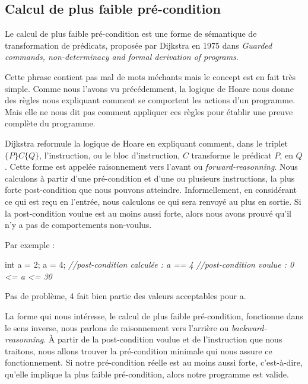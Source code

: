 \documentclass[12pt,francais,]{scrbook}
\newenvironment{Shaded}{}{}
\newcommand{\DataTypeTok}[1]{\textcolor[rgb]{0.56,0.13,0.00}{{#1}}}
\newcommand{\DecValTok}[1]{\textcolor[rgb]{0.25,0.63,0.44}{{#1}}}
\newcommand{\CommentTok}[1]{\textcolor[rgb]{0.38,0.63,0.69}{\textit{{#1}}}}
\newcommand{\NormalTok}[1]{{#1}}
\begin{document}
\subsection{Calcul de plus faible
pré-condition}\label{calcul-de-plus-faible-pruxe9-condition}

Le calcul de plus faible pré-condition est une forme de sémantique de
transformation de prédicats, proposée par Dijkstra en 1975 dans
\emph{Guarded commands, non-determinacy and formal derivation of
programs}.

Cette phrase contient pas mal de mots méchants mais le concept est en
fait très simple. Comme nous l'avons vu précédemment, la logique de
Hoare nous donne des règles nous expliquant comment se comportent les
actions d'un programme. Mais elle ne nous dit pas comment appliquer ces
règles pour établir une preuve complète du programme.

Dijkstra reformule la logique de Hoare en expliquant comment, dans le
triplet \(\{P\}C\{Q\}\), l'instruction, ou le bloc d'instruction, \(C\)
transforme le prédicat \(P\), en \(Q\). Cette forme est appelée
\og{}raisonnement vers l'avant\fg{} ou \emph{forward-reasonning}. Nous
calculons à partir d'une pré-condition et d'une ou plusieurs
instructions, la plus forte post-condition que nous pouvons atteindre.
Informellement, en considérant ce qui est reçu en l'entrée, nous
calculons ce qui sera renvoyé au plus en sortie. Si la post-condition
voulue est au moins aussi forte, alors nous avons prouvé qu'il n'y a pas
de comportements non-voulus.

Par exemple :

\begin{footnotesize}\begin{Shaded}
\begin{Highlighting}[]
\DataTypeTok{int} \NormalTok{a = }\DecValTok{2}\NormalTok{;}
\NormalTok{a = }\DecValTok{4}\NormalTok{;}
\CommentTok{//post-condition calculée : a == 4}
\CommentTok{//post-condition voulue   : 0 <= a <= 30}
\end{Highlighting}
\end{Shaded}\end{footnotesize}

Pas de problème, 4 fait bien partie des valeurs acceptables pour a.

La forme qui nous intéresse, le calcul de plus faible pré-condition,
fonctionne dans le sens inverse, nous parlons de \og{}raisonnement vers
l'arrière\fg{} ou \emph{backward-reasonning}. À partir de la post-condition
voulue et de l'instruction que nous traitons, nous allons trouver la
pré-condition minimale qui nous assure ce fonctionnement. Si notre
pré-condition réelle est au moins aussi forte, c'est-à-dire, qu'elle
implique la plus faible pré-condition, alors notre programme est valide.
\end{document}
